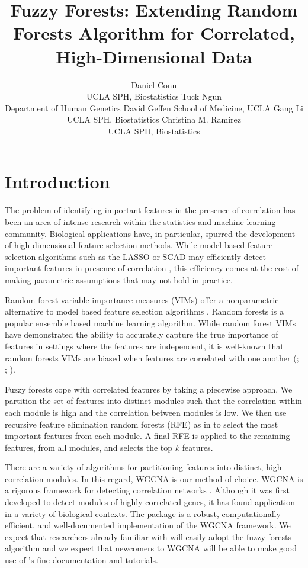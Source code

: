 \documentclass[article,shortnames]{jss}
\author{Daniel Conn\\ UCLA SPH, Biostatistics \AND Tuck Ngun\\Department of Human Genetics David Geffen School of Medicine, UCLA \AND  Gang Li\\UCLA SPH, Biostatistics \And Christina M. Ramirez\\UCLA SPH, Biostatistics}
\title{Fuzzy Forests: Extending Random Forests Algorithm for Correlated, High-Dimensional Data}
\begin{document}

\section{Introduction}
The problem of identifying important features in the presence of correlation has been an area of intense research within the statistics
and machine learning community.  Biological applications have, in particular, spurred the development of high dimensional feature selection methods.   
While model based feature selection algorithms such as the LASSO or SCAD may efficiently detect important features in presence of correlation \citep{raskutti2010restricted}, this efficiency comes at the cost of making parametric assumptions that may not hold in practice. 
 
Random forest variable importance measures (VIMs) offer a nonparametric alternative to model based feature selection algorithms \citep{breiman2001random}.
Random forests is a popular ensemble based machine learning algorithm.  While random forest VIMs have demonstrated the ability to accurately capture the true 
importance of features in settings where the features are independent, it is well-known that random forests VIMs are biased when features are correlated
with one another (\citep{strobl2007bias}; \citep{strobl2008conditional}; \citep{nicodemus2009predictor}).

Fuzzy forests cope with correlated features by taking a piecewise approach.  We partition the set of features into distinct modules such that the correlation within each module is high and the correlation between modules is low.  We then use recursive feature elimination random forests (RFE) as in \citep{diaz2006gene} to select the most important
features from each module.  A final RFE is applied to the remaining features, from all modules, and selects the top $k$ features. 

There are a variety of algorithms for partitioning features into distinct, high correlation modules.  In this regard, WGCNA is our method of choice.  WGCNA is a rigorous framework for detecting correlation networks \citep{zhang2005general}.  Although it was first developed to detect modules of highly correlated genes, it has found application in a variety of biological contexts.  The  package  is a robust, computationally efficient, and well-documented implementation of the WGCNA framework.  We expect that researchers already familiar with  will easily adopt the fuzzy forests algorithm and we expect that newcomers to WGCNA will be able to make good use of 's fine documentation and tutorials.
              
\end{document}

